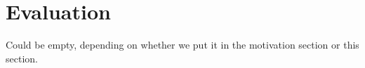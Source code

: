 \section{Evaluation}
\label{sec:evaluation}
Could be empty, depending on whether we put it in the motivation section or this section.